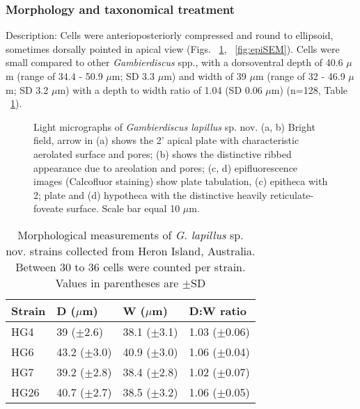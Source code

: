 \documentclass[12pt]{article}
\begin{document}
\subsubsection{Morphology and taxonomical treatment}
\FloatBarrier
Description: Cells were anterioposteriorly compressed and round to ellipsoid, sometimes dorsally pointed in apical view (Figs. ~\ref{fig:PetLM}, ~\ref{fig:epiSEM}). 
Cells were small compared to other \textit{Gambierdiscus} spp., with a dorsoventral depth of 40.6 $\mu$m (range of 34.4 - 50.9 $\mu$m; SD 3.3 $\mu$m) and width of 39 $\mu$m (range of 32 - 46.9 $\mu$m; SD 3.2 $\mu$m) with a depth to width ratio of 1.04 (SD 0.06 $\mu$m) (n=128, Table ~\ref{tbl:SizeTable}). 
 
\begin{figure} 
\caption{Light micrographs of \textit{Gambierdiscus lapillus} sp. nov. (a, b) Bright field, arrow in (a) shows the 2' apical plate with characteristic aerolated surface and pores; (b) shows the distinctive ribbed appearance due to areolation and pores; (c, d) epifluorescence images (Calcofluor staining) show plate tabulation, (c) epitheca with 2; plate and (d) hypotheca with the distinctive heavily reticulate-foveate surface. Scale bar equal 10 $\mu$m.​} 
\label{fig:PetLM}
\end{figure} 


\begin{table}
\caption{Morphological measurements of \emph{G. lapillus }sp. nov. strains collected from Heron Island, Australia. Between 30 to 36 cells were counted per strain. Values in parentheses are $\pm$SD}
\label{tbl:SizeTable}
\begin{tabular}{ | p{2cm} | p{2.5cm} | p{2.5cm} | p{2.5cm} | }
\hline
 \textbf{Strain} & \textbf{D ($\mu$m)} & \textbf{W ($\mu$m)}  & \textbf{D:W ratio}  \\
 \hline
 HG4  & 39 ($\pm$2.6) & 38.1 ($\pm$3.1) & 1.03 ($\pm$0.06) \\

 HG6  & 43.2 ($\pm$3.0) & 40.9 ($\pm$3.0) & 1.06 ($\pm$0.04)  \\

 HG7  & 39.2 ($\pm$2.8) & 38.4 ($\pm$2.8) & 1.02 ($\pm$0.07)  \\

 HG26  & 40.7 ($\pm$2.7) & 38.5 ($\pm$3.2) & 1.06 ($\pm$0.05) \\
 \hline
\end{tabular}
\end{table}
\end{document}
